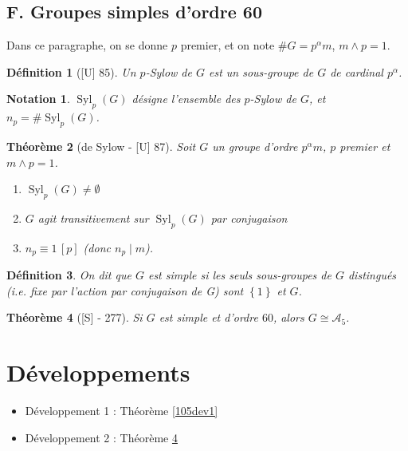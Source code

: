 \documentclass[10pt, a4paper, parskip=full, twoside, twocolumn]{report}
\newtheorem{definition}{Définition}
\newtheorem{theorem}[definition]{Théorème}
\newtheorem*{notation*}{Notation}
\DeclareMathOperator{\Syl}{Syl}
\begin{document}
\subsection*{F. Groupes simples d'ordre 60}
Dans ce paragraphe, on se donne $p$ premier, et on note $\#G = p^{\alpha}m$, $m\wedge p = 1$.

\begin{definition}[\textnormal{[U] 85}]
	Un \emph{$p$-Sylow} de $G$ est un sous-groupe de $G$ de cardinal $p^{\alpha}$.
\end{definition}

\begin{notation*}
	$\Syl_p(G)$ désigne l'ensemble des $p$-Sylow de $G$, et $n_p =\#\Syl_p(G)$.
\end{notation*}

\begin{theorem}[de Sylow - \textnormal{[U] 87}]
	Soit $G$ un groupe d'ordre $p^{\alpha}m$, $p$ premier et $m\wedge p = 1$.
	\begin{enumerate}
		\item $\Syl_p(G)\neq \emptyset$
		\item $G$ agit transitivement sur $\Syl_p(G)$ par conjugaison
		\item $n_p \equiv 1\,[p]$ (donc $n_p\mid m$).
	\end{enumerate}
\end{theorem}

\begin{definition}
	On dit que $G$ est \emph{simple} si les seuls sous-groupes de $G$ distingués (\emph{i.e.} fixe par l'action par conjugaison de G) sont $\left\{1\right\}$ et $G$.
\end{definition}

\begin{tcolorbox}[
    breakable, %
    colback=developpement, %
    colframe=gray!0!black, %
    boxrule=0pt, %
    arc=1mm, %
	boxsep=0pt,
	left=0pt, right=0pt, top=0pt, bottom=0pt
]
\begin{theorem}[\textnormal{[S] - 277}]
	\label{105dev2}
	Si $G$ est simple et d'ordre $60$, alors $G\cong \mathcal{A}_5$.
\end{theorem}
\end{tcolorbox}

\section*{Développements}
\begin{itemize}
	\item Développement 1 : Théorème \ref{105dev1}
	\item Développement 2 : Théorème \ref{105dev2}
\end{itemize}
\end{document}
